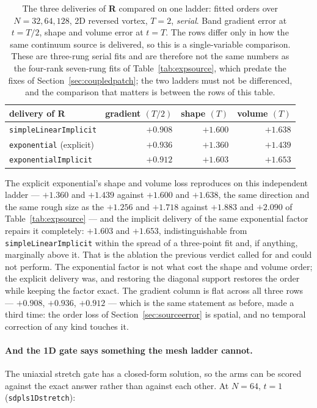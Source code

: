 \documentclass[preprint,3p,11pt]{elsarticle}
\begin{document}
\begin{table}[htbp]
\centering
\caption{The three deliveries of \textbf{R} compared on one ladder: fitted orders
over $N = 32, 64, 128$, 2D reversed vortex, $T=2$, \emph{serial}. Band gradient
error at $t=T/2$, shape and volume error at $t=T$. The rows differ only in how the
same continuum source is delivered, so this is a single-variable comparison. These
are three-rung serial fits and are therefore not the same numbers as the four-rank
seven-rung fits of Table~\ref{tab:expsource}, which predate the fixes of
Section~\ref{sec:coupledpatch}; the two ladders must not be differenced, and the
comparison that matters is between the rows of this table.}
\label{tab:expimplicit}
\small
\begin{tabular}{lrrr}
\toprule
delivery of \textbf{R} & gradient $(T/2)$ & shape $(T)$ & volume $(T)$ \\
\midrule
\texttt{simpleLinearImplicit}  & $+0.908$ & $+1.600$ & $+1.638$ \\
\texttt{exponential} (explicit)& $+0.936$ & $+1.360$ & $+1.439$ \\
\texttt{exponentialImplicit}   & $+0.912$ & $+1.603$ & $+1.653$ \\
\bottomrule
\end{tabular}
\end{table}

The explicit exponential's shape and volume loss reproduces on this independent
ladder --- $+1.360$ and $+1.439$ against $+1.600$ and $+1.638$, the same direction
and the same rough size as the $+1.256$ and $+1.718$ against $+1.883$ and $+2.090$
of Table~\ref{tab:expsource} --- and the implicit delivery of the same exponential
factor repairs it completely: $+1.603$ and $+1.653$, indistinguishable from
\texttt{simpleLinearImplicit} within the spread of a three-point fit and, if
anything, marginally above it. That is the ablation the previous verdict called
for and could not perform. The exponential factor is not what cost the shape and
volume order; the explicit delivery was, and restoring the diagonal support
restores the order while keeping the factor exact. The gradient column is flat
across all three rows --- $+0.908$, $+0.936$, $+0.912$ --- which is the same
statement as before, made a third time: the order loss of
Section~\ref{sec:sourceerror} is spatial, and no temporal correction of any kind
touches it.

\paragraph{And the 1D gate says something the mesh ladder cannot.} The uniaxial
stretch gate has a closed-form solution, so the arms can be scored against the
exact answer rather than against each other. At $N=64$, $t=1$
(\texttt{sdpls1Dstretch}):
\end{document}
